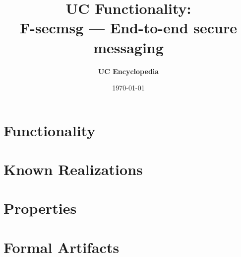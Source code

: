 \documentclass[11pt,a4paper]{article}
\title{\textbf{\Large UC Functionality:}\\[0.2em] \Large F-secmsg --- End-to-end secure messaging}
\author{\textbf{UC Encyclopedia}}
\date{\today}
\newtheorem{functionality}{Functionality}
\begin{document}
\maketitle

\begin{abstract}
\end{abstract}

\section{Functionality}

%

\section{Known Realizations}


\section{Properties}


\section{Formal Artifacts}

\end{document}
